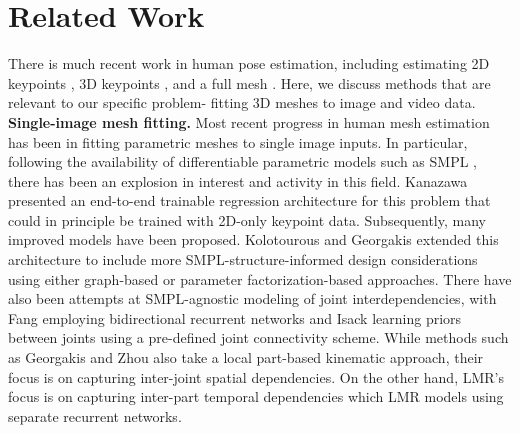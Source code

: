 \documentclass[10pt,twocolumn,letterpaper]{article}
\begin{document}
\section{Related Work}
\label{sec:related}
There is much recent work in human pose estimation, including estimating 2D keypoints \cite{newell2016stacked, cao2019openpose, zhang2020distribution}, 3D keypoints \cite{martinez2017simple,pavlakos2018ordinal,habibie2019wild, iqbal2020weakly,gpa}, and a full mesh \cite{hmrKanazawa17,pavlakos2018learning,humanMotionKanazawa19,kolotouros2019convolutional,Arnab_2019_CVPR,georgakis2020hierarchical,kocabas2019vibe}. Here, we discuss methods that are relevant to our specific problem- fitting 3D meshes to image and video data. 
\\
\indent \textbf{Single-image mesh fitting.} Most recent progress in human mesh estimation has been in fitting parametric meshes to single image inputs. In particular, following the availability of differentiable parametric models such as SMPL \cite{loper2015smpl}, there has been an explosion in interest and activity in this field. Kanazawa \etal \cite{hmrKanazawa17} presented an end-to-end trainable regression architecture for this problem that could in principle be trained with 2D-only keypoint data. Subsequently, many improved models have been proposed. Kolotourous \etal \cite{kolotouros2019convolutional} and Georgakis \etal \cite{georgakis2020hierarchical} extended this architecture to include more SMPL-structure-informed design considerations using either graph-based or parameter factorization-based approaches. There have also been attempts at SMPL-agnostic modeling of joint interdependencies, with Fang \etal \cite{fang2017learning} employing bidirectional recurrent networks and Isack \etal \cite{isack2020repose} learning priors between joints using a pre-defined joint connectivity scheme. While methods such as Georgakis \etal \cite{georgakis2020hierarchical} and Zhou \etal \cite{zhou2016deep} also take a local part-based kinematic approach, their focus is on capturing inter-joint spatial dependencies. On the other hand, LMR's focus is on capturing inter-part temporal dependencies which LMR models using separate recurrent networks.\\
\end{document}
